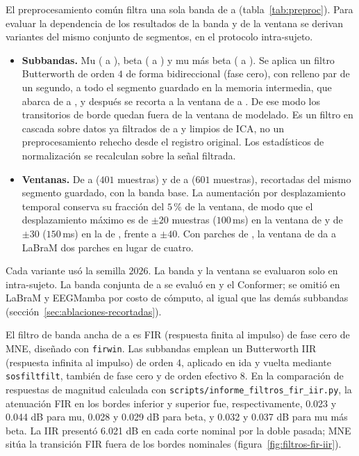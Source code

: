 El preprocesamiento común filtra una sola banda de  a 
(tabla~\ref{tab:preproc}). Para evaluar la dependencia de los resultados de la banda y de
la ventana se derivan variantes del mismo conjunto de segmentos, en el protocolo
intra-sujeto.

\begin{itemize}
  \item \textbf{Subbandas.} Mu ( a ), beta ( a ) y mu más beta
  ( a ). Se aplica un filtro Butterworth de orden $4$ de forma bidireccional (fase cero), con relleno par de un segundo, a todo el segmento guardado en
  la memoria intermedia, que abarca de  a , y después se recorta a la
  ventana de  a . De ese modo los transitorios de borde quedan fuera de la
  ventana de modelado. Es un filtro en cascada sobre datos ya filtrados de  a
   y limpios de ICA, no un preprocesamiento rehecho desde el registro original. Los
  estadísticos de normalización se recalculan sobre la señal filtrada.
  \item \textbf{Ventanas.} De  a  ($401$ muestras) y de  a 
  ($601$ muestras), recortadas del mismo segmento guardado, con la banda base. La
  aumentación por desplazamiento temporal conserva su fracción del $5$\,\% de la ventana,
  de modo que el desplazamiento máximo es de $\pm 20$ muestras ($100$\,ms) en la ventana de
   y de $\pm 30$ ($150$\,ms) en la de , frente a $\pm 40$. Con parches de
  , la ventana de  da a LaBraM dos parches en lugar de cuatro.
\end{itemize}

Cada variante usó la semilla $2026$. La banda y la ventana se evaluaron solo en intra-sujeto.
La banda conjunta de  a  se evaluó en \eegnet{} y el Conformer; se omitió
en LaBraM y EEGMamba por costo de cómputo, al igual que las demás subbandas
(sección~\ref{sec:ablaciones-recortadas}).

El filtro de banda ancha de  a  es FIR (respuesta finita al impulso) de fase cero de MNE,
diseñado con \texttt{firwin}. Las subbandas emplean un Butterworth IIR (respuesta infinita al impulso) de orden 4,
aplicado en ida y vuelta mediante \texttt{sosfiltfilt}, también de fase cero y de
orden efectivo 8. En la comparación de respuestas de magnitud calculada con
\texttt{scripts/informe\_filtros\_fir\_iir.py}, la atenuación FIR en los bordes
inferior y superior fue, respectivamente, 0.023 y 0.044 dB para mu, 0.028 y
0.029 dB para beta, y 0.032 y 0.037 dB para mu más beta. La IIR presentó
6.021 dB en cada corte nominal por la doble pasada; MNE sitúa la transición FIR
fuera de los bordes nominales (figura~\ref{fig:filtros-fir-iir}).

